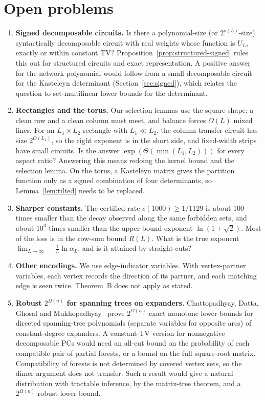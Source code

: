 \section{Open problems}\label{sec:open}

\begin{enumerate}
\item \textbf{Signed decomposable circuits.} Is there a polynomial-size (or $2^{o(L)}$-size) syntactically decomposable circuit with real weights whose function is $U_L$, exactly or within constant TV? Proposition~\ref{prop:structured-signed} rules this out for structured circuits and exact representation. A positive answer for the network polynomial would follow from a small decomposable circuit for the Kasteleyn determinant (Section~\ref{sec:signed}), which relates the question to set-multilinear lower bounds for the determinant.

\item \textbf{Rectangles and the torus.} Our selection lemmas use the square shape: a clean row and a clean column must meet, and balance forces $\Omega(L)$ mixed lines. For an $L_1\times L_2$ rectangle with $L_1\ll L_2$, the column-transfer circuit has size $2^{O(L_1)}$, so the right exponent is in the short side, and fixed-width strips have small circuits. Is the answer $\exp(\Theta(\min(L_1,L_2)))$ for every aspect ratio? Answering this means redoing the kernel bound and the selection lemma. On the torus, a Kasteleyn matrix gives the partition function only as a signed combination of four determinants, so Lemma~\ref{lem:tilted} needs to be replaced.

\item \textbf{Sharper constants.} The certified rate $c(1000)\ge1/1129$ is about $100$ times smaller than the decay observed along the same forbidden sets, and about $10^3$ times smaller than the upper-bound exponent $\ln(1+\sqrt2)$. Most of the loss is in the row-sum bound $R(L)$. What is the true exponent $\lim_{L\to\infty}-\frac1L\ln\alpha_L$, and is it attained by straight cuts?

\item \textbf{Other encodings.} We use edge-indicator variables. With vertex-partner variables, each vertex records the direction of its partner, and each matching edge is seen twice. Theorem~B does not apply as stated.

\item \textbf{Robust $2^{\Omega(n)}$ for spanning trees on expanders.} Chattopadhyay, Datta, Ghosal and Mukhopadhyay~\cite{CDGM22} prove $2^{\Omega(n)}$ exact monotone lower bounds for directed spanning-tree polynomials (separate variables for opposite arcs) of constant-degree expanders. A constant-TV version for nonnegative decomposable PCs would need an all-cut bound on the probability of each compatible pair of partial forests, or a bound on the full square-root matrix. Compatibility of forests is not determined by covered vertex sets, so the dimer argument does not transfer. Such a result would give a natural distribution with tractable inference, by the matrix-tree theorem, and a $2^{\Omega(n)}$ robust lower bound.
\end{enumerate}
